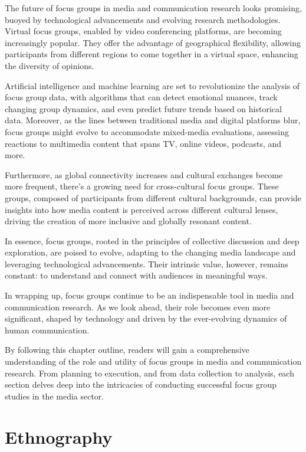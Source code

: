 \documentclass[
  b5paper]{book}
\begin{document}
The future of focus groups in media and communication research looks promising, buoyed by technological advancements and evolving research methodologies. Virtual focus groups, enabled by video conferencing platforms, are becoming increasingly popular. They offer the advantage of geographical flexibility, allowing participants from different regions to come together in a virtual space, enhancing the diversity of opinions.

Artificial intelligence and machine learning are set to revolutionize the analysis of focus group data, with algorithms that can detect emotional nuances, track changing group dynamics, and even predict future trends based on historical data. Moreover, as the lines between traditional media and digital platforms blur, focus groups might evolve to accommodate mixed-media evaluations, assessing reactions to multimedia content that spans TV, online videos, podcasts, and more.

Furthermore, as global connectivity increases and cultural exchanges become more frequent, there's a growing need for cross-cultural focus groups. These groups, composed of participants from different cultural backgrounds, can provide insights into how media content is perceived across different cultural lenses, driving the creation of more inclusive and globally resonant content.

In essence, focus groups, rooted in the principles of collective discussion and deep exploration, are poised to evolve, adapting to the changing media landscape and leveraging technological advancements. Their intrinsic value, however, remains constant: to understand and connect with audiences in meaningful ways.

In wrapping up, focus groups continue to be an indispensable tool in media and communication research. As we look ahead, their role becomes even more significant, shaped by technology and driven by the ever-evolving dynamics of human communication.

By following this chapter outline, readers will gain a comprehensive understanding of the role and utility of focus groups in media and communication research. From planning to execution, and from data collection to analysis, each section delves deep into the intricacies of conducting successful focus group studies in the media sector.

\hypertarget{ethnography-1}{%
\chapter{Ethnography}\label{ethnography-1}}
\end{document}
